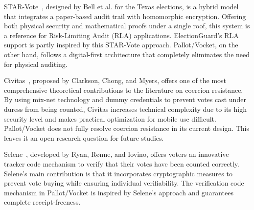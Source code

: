 \documentclass[a4paper,fleqn]{cas-sc}
\begin{document}
STAR-Vote~\cite{Bell2013}, designed by Bell et al. for the Texas elections, is a hybrid model that integrates a paper-based audit trail with homomorphic encryption. Offering both physical security and mathematical proofs under a single roof, this system is a reference for Risk-Limiting Audit (RLA) applications. ElectionGuard's RLA support is partly inspired by this STAR-Vote approach. Pallot/Vocket, on the other hand, follows a digital-first architecture that completely eliminates the need for physical auditing.


Civitas~\cite{Clarkson2008}, proposed by Clarkson, Chong, and Myers, offers one of the most comprehensive theoretical contributions to the literature on coercion resistance. By using mix-net technology and dummy credentials to prevent votes cast under duress from being counted, Civitas increases technical complexity due to its high security level and makes practical optimization for mobile use difficult. Pallot/Vocket does not fully resolve coercion resistance in its current design. This leaves it an open research question for future studies.


Selene~\cite{Ryan2016}, developed by Ryan, Rønne, and Iovino, offers voters an innovative tracker code mechanism to verify that their votes have been counted correctly. Selene's main contribution is that it incorporates cryptographic measures to prevent vote buying while ensuring individual verifiability. The verification code mechanism in Pallot/Vocket is inspired by Selene's approach and guarantees complete receipt-freeness.
\end{document}
